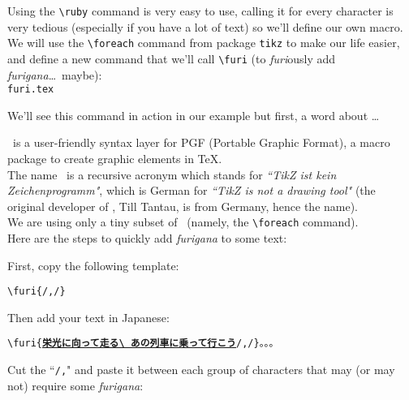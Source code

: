 Using the \lstinline|\ruby| command is very easy to use, calling it for every character is very tedious (especially if you have a lot of text) so we'll define our own macro. \\


We will use the \lstinline|\foreach| command from package  \lstinline|tikz| to make our life easier, and define a new command that we'll call \lstinline|\furi| (to \emph{furi}ously add \emph{furigana}\dots\ maybe): \\



\texttt{furi.tex}  \label{furi} 



We'll see this command in action in our example but first, a word about \TikZ\dots\\

\newpage


\TikZ\ is a user-friendly syntax layer for PGF (Portable Graphic Format), a macro package to create graphic elements in \TeX. \citep{tikz} \\

The name \TikZ\ is a recursive acronym which stands for \emph{``TikZ ist kein Zeichenprogramm"}, which is German for \emph{``TikZ is not a drawing tool"} \citep{wiki-tikz} (the original developer of \TikZ, Till Tantau, is from Germany, hence the name). \\
We are using only a tiny subset of \TikZ\ (namely, the \lstinline|\foreach| command). \\

Here are the steps to quickly add \emph{furigana} to some text: \\


\newcommand{\stress}[1]{\underline{\textbf{#1}}}

First, copy the following template:
\begin{mdframed}
\texttt{\textbackslash furi\{/,/\}
}
\end{mdframed}


Then add your text in Japanese:
\begin{mdframed}
\texttt{\textbackslash furi\{\stress{栄光に向って走る\textbackslash\ あの列車に乗って行こう}/,/\}。。。
}
\end{mdframed}


Cut the ``\lstinline|/,|" and paste it between each group of characters that may (or may not) require some \emph{furigana}:

